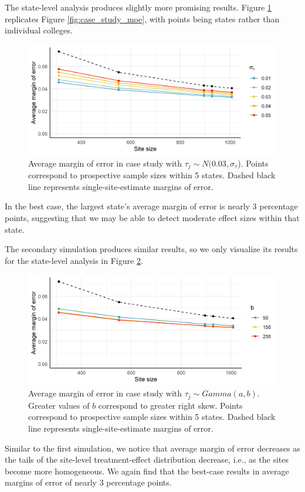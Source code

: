 \documentclass[]{article}
\begin{document}
The state-level analysis produces slightly more promising results.
Figure \ref{fig:case_study_states_moe} replicates Figure \ref{fig:case_study_moe}, with points being states rather than individual colleges.
\begin{figure}[t]
    \centering
    \includegraphics[width=\textwidth]{writeup/images/case_study_states_moe.png}
    \caption{Average margin of error in case study with $\tau_j \sim N(0.03, \sigma_\tau$). Points correspond to prospective sample sizes within 5 states. Dashed black line represents single-site-estimate margins of error.}
    \label{fig:case_study_states_moe}
\end{figure}
In the best case, the largest state's average margin of error is nearly 3 percentage points, suggesting that we may be able to detect moderate effect sizes within that state.

The secondary simulation produces similar results, so we only visualize its results for the state-level analysis in Figure \ref{fig:case_study_2_states_moe}.
\begin{figure}[t]
    \centering
    \includegraphics[width=\textwidth]{writeup/images/case_study2_states_moe.png}
    \caption{Average margin of error in case study with $\tau_j \sim Gamma(a,b)$. Greater values of $b$ correspond to greater right skew. Points correspond to prospective sample sizes within 5 states. Dashed black line represents single-site-estimate margins of error.}
    \label{fig:case_study_2_states_moe}
\end{figure}
Similar to the first simulation, we notice that average margin of error decreases as the tails of the site-level treatment-effect distribution decrease, i.e., as the sites become more homogeneous.
We again find that the best-case results in average margins of error of nearly 3 percentage points.
\end{document}
